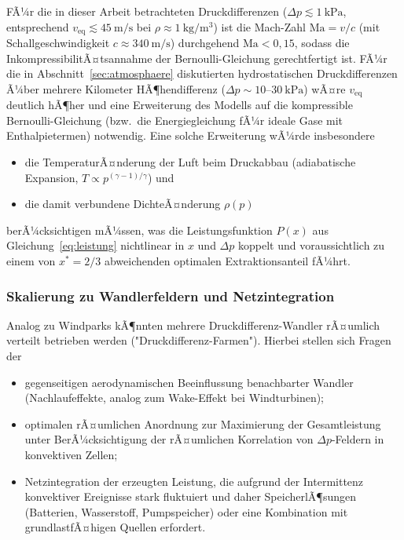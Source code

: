 ﻿\documentclass[a4paper,12pt]{article}
\theoremstyle{definition}
\begin{document}
FÃ¼r die in dieser Arbeit betrachteten Druckdifferenzen
($\Delta p \lesssim 1\ \mathrm{kPa}$, entsprechend $v_{\mathrm{eq}}
\lesssim 45\ \mathrm{m/s}$ bei $\rho \approx 1\ \mathrm{kg/m^3}$) ist die
Mach-Zahl $\mathrm{Ma} = v/c$ (mit Schallgeschwindigkeit $c \approx 340\
\mathrm{m/s}$) durchgehend $\mathrm{Ma} < 0{,}15$, sodass die
InkompressibilitÃ¤tsannahme der Bernoulli-Gleichung gerechtfertigt ist. FÃ¼r
die in Abschnitt~\ref{sec:atmosphaere} diskutierten hydrostatischen
Druckdifferenzen Ã¼ber mehrere Kilometer HÃ¶hendifferenz ($\Delta p \sim
10$--$30\ \mathrm{kPa}$) wÃ¤re $v_{\mathrm{eq}}$ deutlich hÃ¶her und eine
Erweiterung des Modells auf die kompressible Bernoulli-Gleichung (bzw.\
die Energiegleichung fÃ¼r ideale Gase mit Enthalpietermen) notwendig. Eine
solche Erweiterung wÃ¼rde insbesondere
\begin{itemize}
	\item die TemperaturÃ¤nderung der Luft beim Druckabbau
	(adiabatische Expansion, $T \propto p^{(\gamma-1)/\gamma}$) und
	\item die damit verbundene DichteÃ¤nderung $\rho(p)$
\end{itemize}
berÃ¼cksichtigen mÃ¼ssen, was die Leistungsfunktion $P(x)$ aus
Gleichung~\eqref{eq:leistung} nichtlinear in $x$ und $\Delta p$ koppelt
und voraussichtlich zu einem von $x^\ast = 2/3$ abweichenden optimalen
Extraktionsanteil fÃ¼hrt.

\subsubsection{Skalierung zu Wandlerfeldern und Netzintegration}

Analog zu Windparks kÃ¶nnten mehrere Druckdifferenz-Wandler rÃ¤umlich
verteilt betrieben werden ("Druckdifferenz-Farmen"). Hierbei stellen sich
Fragen der
\begin{itemize}
	\item gegenseitigen aerodynamischen Beeinflussung benachbarter
	Wandler (Nachlaufeffekte, analog zum Wake-Effekt bei Windturbinen);
	\item optimalen rÃ¤umlichen Anordnung zur Maximierung der
	Gesamtleistung unter BerÃ¼cksichtigung der rÃ¤umlichen Korrelation von
	$\Delta p$-Feldern in konvektiven Zellen;
	\item Netzintegration der erzeugten Leistung, die aufgrund der
	Intermittenz konvektiver Ereignisse stark fluktuiert und daher
	SpeicherlÃ¶sungen (Batterien, Wasserstoff, Pumpspeicher) oder eine
	Kombination mit grundlastfÃ¤higen Quellen erfordert.
\end{itemize}
\end{document}

